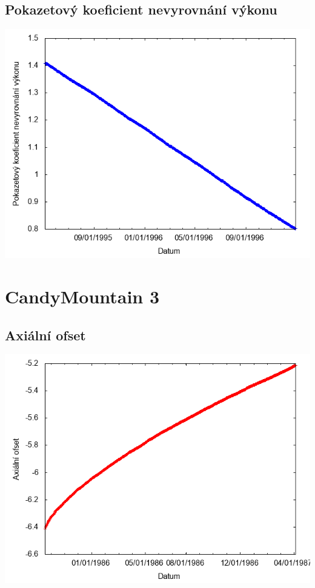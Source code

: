 \documentclass[a4paper,twoside,11pt]{article}
\begin{document}
\subsection*{Pokazetový koeficient nevyrovnání výkonu}
\begin{center}
\includegraphics[width=.8\textwidth]{graphs/CandyMountain_02_fha.png}
\end{center}

\newpage
\section*{CandyMountain 3}
\subsection*{Axiální ofset}
\begin{center}
\includegraphics[width=.8\textwidth]{graphs/CandyMountain_03_ao.png}
\end{center}
\end{document}

